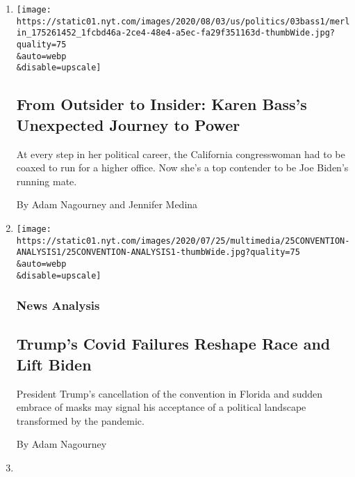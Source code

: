 \begin{enumerate}
\def\labelenumi{\arabic{enumi}.}
\item
  \href{/2020/08/04/us/politics/karen-bass-vice-president-biden.html}{}

  \texttt{[image: https://static01.nyt.com/images/2020/08/03/us/politics/03bass1/merlin\_175261452\_1fcbd46a-2ce4-48e4-a5ec-fa29f351163d-thumbWide.jpg?quality=75\\\&auto=webp\\\&disable=upscale]}

  \hypertarget{from-outsider-to-insider-karen-basss-unexpected-journey-to-power}{%
  \subsection{From Outsider to Insider: Karen Bass's Unexpected Journey
  to
  Power}\label{from-outsider-to-insider-karen-basss-unexpected-journey-to-power}}

  At every step in her political career, the California congresswoman
  had to be coaxed to run for a higher office. Now she's a top contender
  to be Joe Biden's running mate.

  By Adam Nagourney and Jennifer Medina
\item
  \href{/2020/07/25/us/politics/trump-florida-convention.html}{}

  \texttt{[image: https://static01.nyt.com/images/2020/07/25/multimedia/25CONVENTION-ANALYSIS1/25CONVENTION-ANALYSIS1-thumbWide.jpg?quality=75\\\&auto=webp\\\&disable=upscale]}

  \hypertarget{news-analysis}{%
  \subsubsection{News Analysis}\label{news-analysis}}

  \hypertarget{trumps-covid-failures-reshape-race-and-lift-biden}{%
  \subsection{Trump's Covid Failures Reshape Race and Lift
  Biden}\label{trumps-covid-failures-reshape-race-and-lift-biden}}

  President Trump's cancellation of the convention in Florida and sudden
  embrace of masks may signal his acceptance of a political landscape
  transformed by the pandemic.

  By Adam Nagourney
\item
  \href{/2020/07/17/us/trump-biden-2020-election.html}{}


\end{enumerate}
